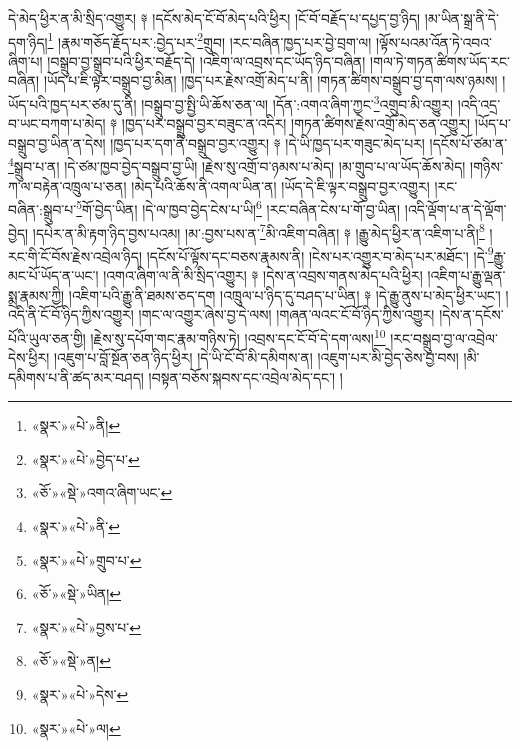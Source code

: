 དེ་མེད་ཕྱིར་ན་མི་སྲིད་འགྱུར། ༈ །དངོས་མེད་ངོ་བོ་མེད་པའི་ཕྱིར། །ངོ་བོ་བརྗོད་པ་དཔྱད་བྱ་ཉིད། །མ་ཡིན་སྒྲ་ནི་དེ་དག་ཉིད།\footnote{«སྣར་»«པེ་»ནི།} །རྣམ་གཅོད་རྗོད་པར་:བྱེད་པར་\footnote{«སྣར་»«པེ་»བྱེད་པ་}གྲུབ། །རང་བཞིན་ཁྱད་པར་བྱེ་བྲག་ལ། །ལྟོས་པའམ་འོན་ཏེ་འབའ་ཞིག་པ། །བསྒྲུབ་བྱ་སྒྲུབ་པའི་ཕྱིར་བརྗོད་དེ། །འཇིག་ལ་འབྲས་དང་ཡོད་ཉིད་བཞིན། །གལ་ཏེ་གཏན་ཚིགས་ཡོད་རང་བཞིན། །ཡོད་པ་ཇི་ལྟར་བསྒྲུབ་བྱ་མིན། །ཁྱད་པར་རྗེས་འགྲོ་མེད་པ་ནི། །གཏན་ཚིགས་བསྒྲུབ་བྱ་དག་ལས་ཉམས། །ཡོད་པའི་ཁྱད་པར་ཙམ་དུ་ནི། །བསྒྲུབ་བྱ་སྤྱི་ཡི་ཆོས་ཅན་ལ། །དོན་:འགའ་ཞིག་ཀྱང་\footnote{«ཅོ་»«སྡེ་»འགའ་ཞིག་ཡང་}འགྲུབ་མི་འགྱུར། །འདི་འདྲ་བ་ཡང་བཀག་པ་མེད། ༈ །ཁྱད་པར་བསྒྲུབ་བྱར་བཟུང་ན་འདིར། །གཏན་ཚིགས་རྗེས་འགྲོ་མེད་ཅན་འགྱུར། །ཡོད་པ་བསྒྲུབ་བྱ་ཡིན་ན་དེས། །ཁྱད་པར་དག་ནི་བསྒྲུབ་བྱར་འགྱུར། ༈ །དེ་ཡི་ཁྱད་པར་གཟུང་མེད་པར། །དངོས་པོ་ཙམ་ན་\footnote{«སྣར་»«པེ་»ནི་}སྒྲུབ་པ་ན། །དེ་ཙམ་ཁྱབ་བྱེད་བསྒྲུབ་བྱ་ཡི། །རྗེས་སུ་འགྲོ་བ་ཉམས་པ་མེད། །མ་གྲུབ་པ་ལ་ཡོད་ཆོས་མེད། །གཉིས་ཀ་ལ་བརྟེན་འཁྲུལ་པ་ཅན། །མེད་པའི་ཆོས་ནི་འགལ་ཡིན་ན། །ཡོད་དེ་ཇི་ལྟར་བསྒྲུབ་བྱར་འགྱུར། །རང་བཞིན་:སྒྲུབ་པ་\footnote{«སྣར་»«པེ་»གྲུབ་པ་}གོ་བྱེད་ཡིན། །དེ་ལ་ཁྱབ་བྱེད་ངེས་པ་ཡི།\footnote{«ཅོ་»«སྡེ་»ཡིན།} །རང་བཞིན་ངེས་པ་གོ་བྱ་ཡིན། །འདི་ལྡོག་པ་ན་དེ་ལྡོག་བྱེད། །དཔེར་ན་མི་རྟག་ཉིད་བྱས་པའམ། །མ་:བྱས་པས་ན་\footnote{«སྣར་»«པེ་»བྱས་པ་}མི་འཇིག་བཞིན། ༈ །རྒྱུ་མེད་ཕྱིར་ན་འཇིག་པ་ནི།\footnote{«ཅོ་»«སྡེ་»ན།} །རང་གི་ངོ་བོས་རྗེས་འབྲེལ་ཉིད། །དངོས་པོ་ལྟོས་དང་བཅས་རྣམས་ནི། །ངེས་པར་འགྱུར་བ་མེད་པར་མཐོང་། །དེ་\footnote{«སྣར་»«པེ་»དེས་}རྒྱུ་མང་པོ་ཡོད་ན་ཡང་། །འགའ་ཞིག་ལ་ནི་མི་སྲིད་འགྱུར། ༈ །དེས་ན་འབྲས་གནས་མེད་པའི་ཕྱིར། །འཇིག་པ་རྒྱུ་ལྡན་སྨྲ་རྣམས་ཀྱི། །འཇིག་པའི་རྒྱུ་ནི་ཐམས་ཅད་དག །འཁྲུལ་པ་ཉིད་དུ་བཤད་པ་ཡིན། ༈ །དེ་རྒྱུ་ནུས་པ་མེད་ཕྱིར་ཡང་། །འདི་ནི་ངོ་བོ་ཉིད་ཀྱིས་འགྱུར། །གང་ལ་འགྱུར་ཞེས་བྱ་དེ་ལས། །གཞན་ལའང་ངོ་བོ་ཉིད་ཀྱིས་འགྱུར། །དེས་ན་དངོས་པོའི་ཡུལ་ཅན་གྱི། །རྗེས་སུ་དཔོག་གང་རྣམ་གཉིས་ཏེ། །འབྲས་དང་ངོ་བོ་དེ་དག་ལས།\footnote{«སྣར་»«པེ་»ལ།} །རང་བསྒྲུབ་བྱ་ལ་འབྲེལ་དེས་ཕྱིར། །འཇུག་པ་བློ་སྔོན་ཅན་ཉིད་ཕྱིར། །དེ་ཡི་ངོ་བོ་མི་དམིགས་ན། །འཇུག་པར་མི་བྱེད་ཅེས་བྱ་བས། །མི་དམིགས་པ་ནི་ཚད་མར་བཤད། །བསྟན་བཅོས་སྐབས་དང་འབྲེལ་མེད་དང་། །
